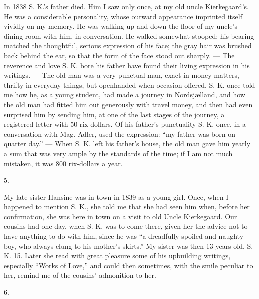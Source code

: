 \documentclass[12pt,a4paper,openany]{book}
\newcommand{\secnum}[1]{\par\begin{center}#1\end{center}\par\nobreak}
\newcommand{\opage}[1]{\marginnote{\footnotesize\textit{[#1]}}}
\begin{document}
In 1838 S. K.'s father died. Him I saw only
once, at my old uncle Kierkegaard's. He was
a considerable personality, whose outward appearance imprinted itself vividly
on my memory. He was walking up and down
the floor of my uncle's dining room with him, in conversation. He
walked somewhat stooped; his bearing matched the thoughtful,
serious expression of his face; the gray hair was brushed
back behind the ear, so that the form of the face stood out sharply.
--- The reverence and love S. K. bore his
father have found their living expression in his writings.
--- The old man was a very punctual man, exact in money matters,
thrifty in everyday things, but openhanded when occasion
offered. S. K. once told me how
he, as a young student, had made a journey in Nordsjælland,
and how the old man had fitted him out
generously with travel money, and then had even surprised him
by sending him, at one of the last stages of the journey, a
registered letter with 50 rix-dollars. Of his father's punctuality
S. K. once, in a conversation with Mag. Adler, used the expression:
``my father was born on quarter day.'' --- When S. K. left
his father's house, the old man gave him yearly a sum that
was very ample by the standards of the time; if I am not
much mistaken, it was 800 rix-dollars a year.

\secnum{5.}

My late sister Hansine was in town in 1839 as a young girl.
Once, when I happened to mention S. K.,
she told me that she had seen him when, before her
confirmation, she was here in town on a visit to old Uncle
\opage{341}Kierkegaard. Our cousins had one day, when S. K.
was to come there, given her the advice not to have anything
to do with him, since he was ``a dreadfully spoiled
and naughty boy, who always clung to his mother's skirts.''
My sister was then 13 years old, S. K. 15.
Later she read with great pleasure some of his upbuilding
writings, especially ``Works of Love,'' and
could then sometimes, with the smile peculiar to her,
remind me of the cousins' admonition to her.

\secnum{6.}
\end{document}
